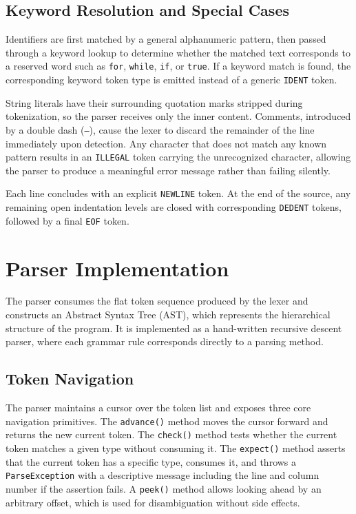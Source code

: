 \subsection{Keyword Resolution and Special Cases}

Identifiers are first matched by a general alphanumeric pattern, then passed through a keyword lookup to determine whether the matched text corresponds to a reserved word such as \texttt{for}, \texttt{while}, \texttt{if}, or \texttt{true}. If a keyword match is found, the corresponding keyword token type is emitted instead of a generic \texttt{IDENT} token.

String literals have their surrounding quotation marks stripped during tokenization, so the parser receives only the inner content. Comments, introduced by a double dash (\texttt{--}), cause the lexer to discard the remainder of the line immediately upon detection. Any character that does not match any known pattern results in an \texttt{ILLEGAL} token carrying the unrecognized character, allowing the parser to produce a meaningful error message rather than failing silently.

Each line concludes with an explicit \texttt{NEWLINE} token. At the end of the source, any remaining open indentation levels are closed with corresponding \texttt{DEDENT} tokens, followed by a final \texttt{EOF} token.

\section{Parser Implementation}

The parser consumes the flat token sequence produced by the lexer and constructs an Abstract Syntax Tree (AST), which represents the hierarchical structure of the program. It is implemented as a hand-written recursive descent parser, where each grammar rule corresponds directly to a parsing method.

\subsection{Token Navigation}

The parser maintains a cursor over the token list and exposes three core navigation primitives. The \texttt{advance()} method moves the cursor forward and returns the new current token. The \texttt{check()} method tests whether the current token matches a given type without consuming it. The \texttt{expect()} method asserts that the current token has a specific type, consumes it, and throws a \texttt{ParseException} with a descriptive message including the line and column number if the assertion fails. A \texttt{peek()} method allows looking ahead by an arbitrary offset, which is used for disambiguation without side effects.


